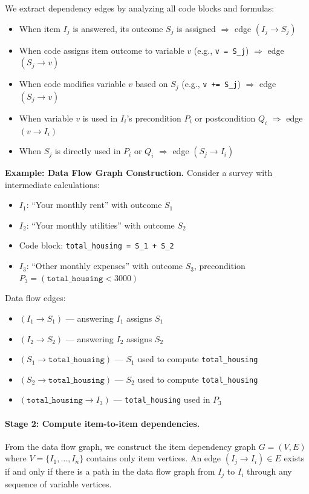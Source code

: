 We extract dependency edges by analyzing all code blocks and formulas:
\begin{itemize}
    \item When item $I_j$ is answered, its outcome $S_j$ is assigned $\Rightarrow$ edge $(I_j \to S_j)$
    \item When code assigns item outcome to variable $v$ (e.g., \texttt{v = S\_j}) $\Rightarrow$ edge $(S_j \to v)$
    \item When code modifies variable $v$ based on $S_j$ (e.g., \texttt{v += S\_j}) $\Rightarrow$ edge $(S_j \to v)$
    \item When variable $v$ is used in $I_i$'s precondition $P_i$ or postcondition $Q_i$ $\Rightarrow$ edge $(v \to I_i)$
    \item When $S_j$ is directly used in $P_i$ or $Q_i$ $\Rightarrow$ edge $(S_j \to I_i)$
\end{itemize}

\begin{mdframed}
\noindent\textbf{Example: Data Flow Graph Construction.} Consider a survey with intermediate calculations:
\begin{itemize}
    \item $I_1$: ``Your monthly rent'' with outcome $S_1$
    \item $I_2$: ``Your monthly utilities'' with outcome $S_2$
    \item Code block: \texttt{total\_housing = S\_1 + S\_2}
    \item $I_3$: ``Other monthly expenses'' with outcome $S_3$, precondition $P_3 = (\texttt{total\_housing} < 3000)$
\end{itemize}

Data flow edges:
\begin{itemize}
    \item $(I_1 \to S_1)$ — answering $I_1$ assigns $S_1$
    \item $(I_2 \to S_2)$ — answering $I_2$ assigns $S_2$
    \item $(S_1 \to \texttt{total\_housing})$ — $S_1$ used to compute \texttt{total\_housing}
    \item $(S_2 \to \texttt{total\_housing})$ — $S_2$ used to compute \texttt{total\_housing}
    \item $(\texttt{total\_housing} \to I_3)$ — \texttt{total\_housing} used in $P_3$
\end{itemize}
\end{mdframed}

\paragraph{Stage 2: Compute item-to-item dependencies.} From the data flow graph, we construct the item dependency graph $G = (V, E)$ where $V = \{I_1, \dots, I_n\}$ contains only item vertices. An edge $(I_j \to I_i) \in E$ exists if and only if there is a path in the data flow graph from $I_j$ to $I_i$ through any sequence of variable vertices.

